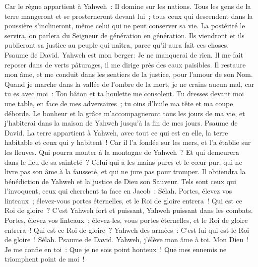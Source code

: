 \begin{multicols}{2}
Car le règne appartient à Yahweh~: Il domine sur les nations.
Tous les gens de la terre mangeront et se prosterneront devant lui~; tous ceux qui descendent dans la poussière s'inclineront, même celui qui ne peut conserver sa vie.
La postérité le servira, on parlera du Seigneur de génération en génération.
Ils viendront et ils publieront sa justice au peuple qui naîtra, parce qu'il aura fait ces choses.
\VerseOne{}Psaume de David. Yahweh est mon berger: Je ne manquerai de rien.
Il me fait reposer dans de verts pâturages, il me dirige près des eaux paisibles.
Il restaure mon âme, et me conduit dans les sentiers de la justice, pour l'amour de son Nom.
Quand je marche dans la vallée de l'ombre de la mort, je ne crains aucun mal, car tu es avec moi~: Ton bâton et ta houlette me consolent.
Tu dresses devant moi une table, en face de mes adversaires~; tu oins d'huile ma tête et ma coupe déborde.
Le bonheur et la grâce m'accompagneront tous les jours de ma vie, et j'habiterai dans la maison de Yahweh jusqu'à la fin de mes jours.
\VerseOne{}Psaume de David. La terre appartient à Yahweh, avec tout ce qui est en elle, la terre habitable et ceux qui y habitent~!
Car il l'a fondée sur les mers, et l'a établie sur les fleuves.
Qui pourra monter à la montagne de Yahweh~? Et qui demeurera dans le lieu de sa sainteté~?
Celui qui a les mains pures et le cœur pur, qui ne livre pas son âme à la fausseté, et qui ne jure pas pour tromper.
Il obtiendra la bénédiction de Yahweh et la justice de Dieu son Sauveur.
Tels sont ceux qui l'invoquent, ceux qui cherchent ta face en Jacob~: Sélah.
Portes, élevez vos linteaux~; élevez-vous portes éternelles, et le Roi de gloire entrera~!
Qui est ce Roi de gloire~? C'est Yahweh fort et puissant, Yahweh puissant dans les combats.
Portes, élevez vos linteaux~; élevez-les, vous portes éternelles, et le Roi de gloire entrera~!
Qui est ce Roi de gloire~? Yahweh des armées~: C'est lui qui est le Roi de gloire~! Sélah.
\VerseOne{}Psaume de David.  Yahweh, j'élève mon âme à toi.
 Mon Dieu~! Je me confie en toi~: Que je ne sois point honteux~! Que mes ennemis ne triomphent point de moi~!

\end{multicols}
